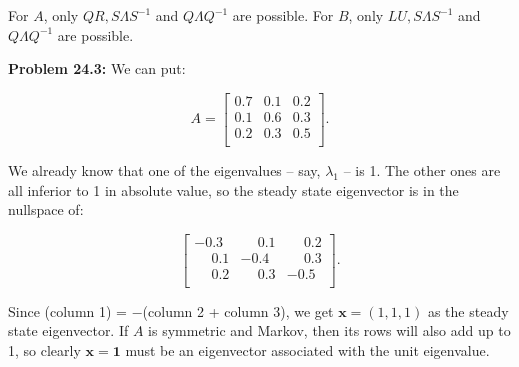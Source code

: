 \documentclass{article}
\begin{document}
For $A$, only $QR, S\Lambda S^{-1}$ and $Q\Lambda Q^{-1}$ are possible. For $B$, only $LU, S\Lambda S^{-1}$ and $Q\Lambda Q^{-1}$ are possible.

\noindent \textbf{Problem 24.3:} We can put:

\[
A = \begin{bmatrix}
0.7 & 0.1 & 0.2\\
0.1 & 0.6 & 0.3\\
0.2 & 0.3 & 0.5\\
\end{bmatrix}.
\]

We already know that one of the eigenvalues -- say, $\lambda_1$ -- is 1. The other ones are all inferior to 1 in absolute value, so the steady state eigenvector is in the nullspace of:

\[
\begin{bmatrix}
-0.3 & \phantom{-}0.1 & \phantom{-}0.2\\
\phantom{-}0.1 & -0.4 & \phantom{-}0.3\\
\phantom{-}0.2 & \phantom{-}0.3 & -0.5\\
\end{bmatrix}.
\]

Since (column 1) = $-$(column 2 + column 3), we get $\mathbf{x} = (1, 1, 1)$ as the steady state eigenvector. If $A$ is symmetric and Markov, then its rows will also add up to 1, so clearly $\mathbf{x = 1}$ must be an eigenvector associated with the unit eigenvalue.
\end{document}
